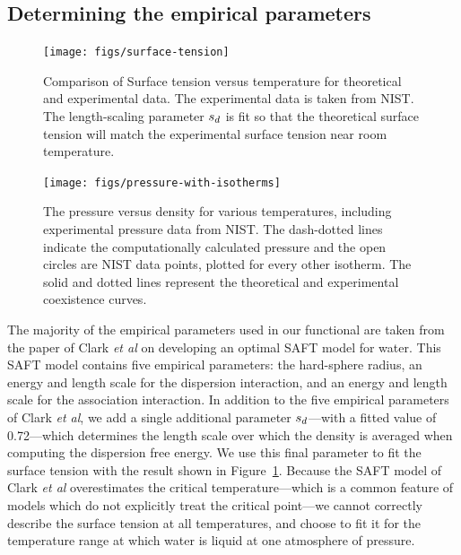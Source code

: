 \documentclass[letterpaper,twocolumn,amsmath,amssymb,prb]{revtex4-1}
\begin{document}
\subsection{Determining the empirical parameters}\label{sec:empirical}

\begin{figure}
\begin{center}
\texttt{[image: figs/surface-tension]}
\end{center}
\caption{Comparison of Surface tension versus temperature for theoretical and
  experimental data. The experimental data is taken from NIST.\cite{nistwater}
  The length-scaling parameter $s_d$ is fit so that the theoretical surface 
  tension will match the experimental surface tension near room temperature.}
\label{fig:surface-tension}
\end{figure}

\begin{figure}
\begin{center}
\texttt{[image: figs/pressure-with-isotherms]}
\end{center}
\caption{The pressure versus density for various temperatures, including
experimental pressure data from NIST\cite{nistwater}. The dash-dotted lines
indicate the computationally calculated pressure and the open circles are 
NIST data points, plotted for every other isotherm. The solid and dotted lines
represent the theoretical and experimental coexistence curves.}
\label{fig:pressure-with-isotherms}
\end{figure}

The majority of the empirical parameters used in our functional are
taken from the paper of Clark \emph{et al} on developing an optimal
SAFT model for water\cite{clark2006developing}.  This SAFT model
contains five empirical parameters: the hard-sphere radius, an energy
and length scale for the dispersion interaction, and an energy and
length scale for the association interaction.  In addition to the five
empirical parameters of Clark \emph{et al}, we add a single additional
parameter $s_d$---with a fitted value of 0.72---which determines
the length scale over which the density is averaged when computing the
dispersion free energy.  We use this final parameter to fit the
surface tension with the result shown in
Figure~\ref{fig:surface-tension}.  Because the SAFT model of Clark
\emph{et al} overestimates the critical temperature---which is a
common feature of models which do not explicitly treat the critical
point---we cannot correctly describe the surface tension at all
temperatures, and choose to fit it for the temperature range at which
water is liquid at one atmosphere of pressure.
\end{document}
